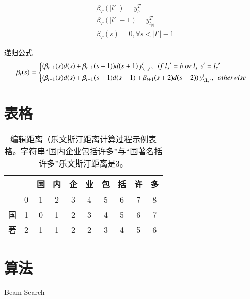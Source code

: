 \documentclass[winfonts]{njuthesis}
\begin{document}
\begin{equation}
\begin{aligned}
&\beta_T(|l{}'|)=y_{b}^{T}\\
&\beta_T(|l{}'|-1)=y_{l_|l|}^{T} \\
&\beta_T(s)=0, \forall s < |l{}'|-1
\end{aligned}
\end{equation}

递归公式
\begin{equation}
\beta_t(s)=\left\{
\begin{aligned}
& (\beta_{t+1}(s) d(s)+\beta_{t+1}(s+1))d(s+1)\,  y_{\l_s{}'}^t, \: \: if \:  l_s{}'=b \:  or \:  l_{s+2}{}'=l_s{}'\\
& (\beta_{t+1}(s) d(s)+\beta_{t+1}(s+1)d(s+1)+\beta_{t+1}(s+2)d(s+2))\,  y_{\l_s{}'}^t,\: \:   otherwise
\end{aligned}
\right.
\end{equation}

\section{表格}

\begin{table}[htbp]
\setlength{\belowcaptionskip}{7pt}
  \centering
\begin{tabular}{|c|c|c|c|c|c|c|c|c|c|}
\hline 
  &   & 国 & 内 & 企 & 业 & 包 & 括 & 许 & 多 \\ 
\hline 
  & 0 & 1 & 2 & 3 & 4 & 5 & 6 & 7 & 8 \\ 
\hline 
国 & 1 & 0 & 1 & 2 & 3 & 4 & 5 & 6 & 7 \\ 
\hline 
著 & 2 & 1 & 1 & 2 & 2 & 3 & 4 & 5 & 6 \\ 
\hline
\end{tabular} 
\vspace{0.2cm}
  \caption{编辑距离（乐文斯汀距离计算过程示例表格。字符串``国内企业包括许多''与``国著名括许多''乐文斯汀距离是3。}\label{table:ld}
\end{table}


\section{算法}

\begin{algorithm}
\caption{Beam Search}
\label{alg:beam}
\begin{algorithmic}[1]
\ELSE 
{}
\ENDIF
\ENDWHILE
\end{algorithmic}
\end{algorithm}
\end{document}
